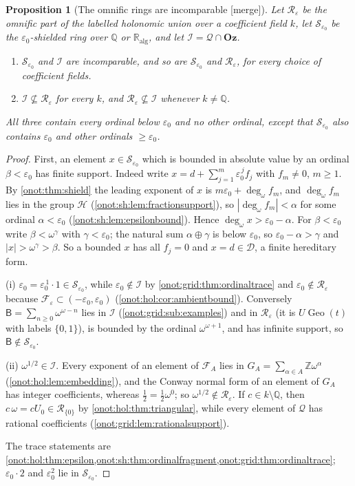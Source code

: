 \documentclass[11pt,oneside]{article}
\numberwithin{equation}{section}
\newtheorem{proposition}[proposition]{Proposition}
\theoremstyle{definition}
\theoremstyle{remark}
\newcommand{\Oz}{\mathbf{Oz}}
\newcommand{\Z}{\mathbb Z}
\newcommand{\Q}{\mathbb Q}
\newcommand{\R}{\mathbb R}
\newcommand{\Ralg}{\R_{\mathrm{alg}}}
\newcommand{\Hh}{\mathcal H}
\newcommand{\Dd}{\mathcal D}
\newcommand{\SE}{\mathcal S_{\varepsilon_0}}
\newcommand{\QO}{\mathcal Q}
\newcommand{\IO}{\mathcal I}
\newcommand{\sB}{\mathsf B}
\newcommand{\ddeg}{\operatorname{deg}_{\omega}}
\newcommand{\Geo}{\operatorname{Geo}}
\newcommand{\mergetag}{\textup{\textsf{\small[merge]}}}
\begin{document}
\begin{proposition}[The omnific rings are incomparable \mergetag]\label{onot:grid:prop:incomparable}
Let $\mathcal R_\varepsilon$ be the omnific part of the labelled holonomic union
over a coefficient field $k$, let $\SE$ be the $\varepsilon_0$-shielded ring over
$\Q$ or $\Ralg$, and let $\IO=\QO\cap\Oz$.
\begin{enumerate}[label=\textup{(\roman*)}]
\item $\SE$ and $\IO$ are incomparable, and so are $\SE$ and $\mathcal
R_\varepsilon$, for every choice of coefficient fields.
\item $\IO\not\subseteq\mathcal R_\varepsilon$ for every $k$, and
$\mathcal R_\varepsilon\not\subseteq\IO$ whenever $k\ne\Q$.
\end{enumerate}
All three contain every ordinal below $\varepsilon_0$ and no other ordinal, except
that $\SE$ also contains $\varepsilon_0$ and other ordinals $\ge\varepsilon_0$.
\end{proposition}
\begin{proof}
First, an element $x\in\SE$ which is bounded in absolute value by an ordinal
$\beta<\varepsilon_0$ has finite support. Indeed write
$x=d+\sum_{j=1}^m\varepsilon_0^{\,j}f_j$ with $f_m\ne0$, $m\ge1$. By
\cref{onot:thm:shield} the leading exponent of $x$ is
$m\varepsilon_0+\ddeg f_m$, and $\ddeg f_m$ lies in the group $\Hh$
(\cref{onot:sh:lem:fractionsupport}), so $|\ddeg f_m|<\alpha$ for some ordinal
$\alpha<\varepsilon_0$ (\cref{onot:sh:lem:epsilonbound}). Hence
$\ddeg x>\varepsilon_0-\alpha$. For $\beta<\varepsilon_0$ write
$\beta<\omega^{\gamma}$ with $\gamma<\varepsilon_0$; the natural sum
$\alpha\oplus\gamma$ is below $\varepsilon_0$, so $\varepsilon_0-\alpha>\gamma$ and
$|x|>\omega^\gamma>\beta$. So a bounded $x$ has all $f_j=0$ and $x=d\in\Dd$, a
finite hereditary form.

(i) $\varepsilon_0=\varepsilon_0^{\,1}\cdot1\in\SE$, while $\varepsilon_0\notin\IO$
by \cref{onot:grid:thm:ordinaltrace} and $\varepsilon_0\notin\mathcal R_\varepsilon$
because $\mathcal F_\varepsilon\subset(-\varepsilon_0,\varepsilon_0)$
(\cref{onot:hol:cor:ambientbound}). Conversely $\sB=\sum_{n\ge0}\omega^{\omega-n}$
lies in $\IO$ (\cref{onot:grid:sub:examples}) and in $\mathcal R_\varepsilon$ (it is
$U\Geo(t)$ with labels $\{0,1\}$), is bounded by the ordinal $\omega^{\omega+1}$,
and has infinite support, so $\sB\notin\SE$.

(ii) $\omega^{1/2}\in\IO$. Every exponent of an element of $\mathcal F_A$ lies in
$G_A=\sum_{\alpha\in A}\Z\omega^\alpha$ (\cref{onot:hol:lem:embedding}), and the
Conway normal form of an element of $G_A$ has integer coefficients, whereas
$\tfrac12=\tfrac12\omega^0$; so $\omega^{1/2}\notin\mathcal R_\varepsilon$. If
$c\in k\setminus\Q$, then $c\,\omega=cU_0\in\mathcal R_{\{0\}}$ by
\cref{onot:hol:thm:triangular}, while every element of $\QO$ has rational
coefficients (\cref{onot:grid:lem:rationalsupport}).

The trace statements are \cref{onot:hol:thm:epsilon,onot:sh:thm:ordinalfragment,onot:grid:thm:ordinaltrace};
$\varepsilon_0\cdot2$ and $\varepsilon_0^2$ lie in $\SE$.
\end{proof}
\end{document}
